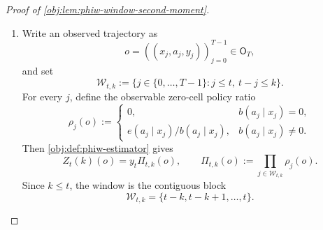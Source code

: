 \begin{proof}[Proof of \cref{obj:lem:phiw-window-second-moment}]
\begin{enumerate}
\item
Write an observed trajectory as
\[
o=((x_j,a_j,y_j))_{j=0}^{T-1}\in \mathsf O_T,
\]
and set
\[
\mathcal W_{t,k}
:=
\{j\in\{0,\ldots,T-1\}: j\le t,\ t-j\le k\}.
\]
For every \(j\), define the observable zero-cell policy ratio
\[
\rho_j(o)
:=
\begin{cases}
0, & b(a_j\mid x_j)=0,\\[2mm]
e(a_j\mid x_j)/b(a_j\mid x_j), & b(a_j\mid x_j)\ne 0.
\end{cases}
\]
Then \cref{obj:def:phiw-estimator} gives
\[
Z_t(k)(o)=y_t\Pi_{t,k}(o),
\qquad
\Pi_{t,k}(o):=\prod_{j\in\mathcal W_{t,k}}\rho_j(o).
\]
Since \(k\le t\), the window is the contiguous block
\[
\mathcal W_{t,k}=\{t-k,t-k+1,\ldots,t\}.
\]


\end{enumerate}
\end{proof}
